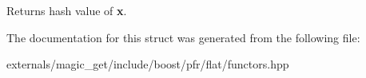 \begin{DoxyReturn}{Returns}
hash value of {\bfseries x}.
\end{DoxyReturn}


The documentation for this struct was generated from the following file\+:\begin{DoxyCompactItemize}
\item 
externals/magic\+\_\+get/include/boost/pfr/flat/functors.\+hpp\end{DoxyCompactItemize}
